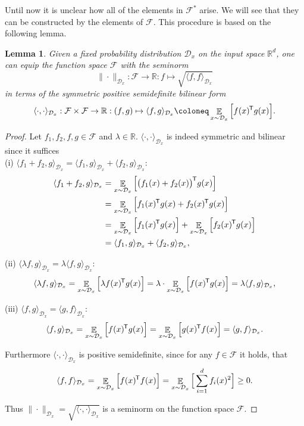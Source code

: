 \documentclass[11pt, a4paper]{article}
\newtheorem{lemma}[theorem]{Lemma}
\newcommand{\R}{\mathbb{R}}
\newcommand{\D}{\mathcal{D}}
\newcommand{\F}{\mathcal{F}}
\newcommand*{\tr}{^{\mkern-1.5mu\mathsf{T}}}
\DeclareMathOperator*{\E}{\mathbb{E}}
\begin{document}
Until now it is unclear how all of the elements in $\F^*$ arise. We will see that they can be constructed by the elements of $\F$. This procedure is based on the following lemma.

\begin{lemma}
Given a fixed probability distribution $\D_x$ on the input space $\R^d$, one can equip the function space $\F$ with the seminorm
\[ \| \cdot \|_{\D_x} : \F \to \R : f \mapsto \sqrt{\langle f , f \rangle_{\D_x}} \] 
in terms of the symmetric positive semidefinite bilinear form
\[ \langle \cdot,\cdot \rangle_{\D_x} : \F \times \F \to \R : (f,g) \mapsto \langle f,g \rangle_{\D_x} \coloneq \E_{x \sim \D_x} \Big [ f(x)\tr g(x) \Big ].\]
\end{lemma}

\begin{proof}
Let $f_1, f_2, f, g \in \F$ and $\lambda \in \R$. $\langle \cdot,\cdot \rangle_{\D_x}$ is indeed symmetric and bilinear since it suffices \\

(i) $\langle f_1 + f_2 , g \rangle_{\D_x} = \langle f_1 , g \rangle_{\D_x} + \langle f_2 , g \rangle_{\D_x}$:
\[ \begin{split}
\langle f_1 + f_2 , g \rangle_{\D_x}
&= \E_{x \sim \D_x} \Big [ \big ( f_1(x) + f_2(x) \big )\tr g(x) \Big ] \\\
&= \E_{x \sim \D_x} \Big [ f_1(x)\tr g(x) + f_2(x)\tr g(x) \Big ] \\\
&= \E_{x \sim \D_x} \Big [ f_1(x)\tr g(x) \Big ] + \E_{x \sim \D_x} \Big [ f_2(x)\tr g(x) \Big ] \\\
&= \langle f_1 , g \rangle_{\D_x} + \langle f_2 , g \rangle_{\D_x},
\end{split} \]

(ii) $\langle \lambda f , g \rangle_{\D_x} = \lambda \langle f, g \rangle_{\D_x}$:
\[ \langle \lambda f , g \rangle_{\D_x} = \E_{x \sim \D_x} \Big [ \lambda f(x)\tr g(x) \Big ] = \lambda \cdot \E_{x \sim \D_x} \Big [ f(x)\tr g(x) \Big ] = \lambda \langle f, g \rangle_{\D_x}, \]

(iii) $\langle f , g \rangle_{\D_x} = \langle g , f \rangle_{\D_x}$:
\[ \langle f , g \rangle_{\D_x} = \E_{x \sim \D_x} \Big [ f(x)\tr g(x) \Big ] = \E_{x \sim \D_x} \Big [ g(x)\tr f(x) \Big ] = \langle g , f \rangle_{\D_x}. \]

Furthermore $\langle \cdot,\cdot \rangle_{\D_x}$ is positive semidefinite, since for any $f \in \F$ it holds, that
\[ \langle f , f \rangle_{\D_x} =  \E_{x \sim \D_x} \Big [ f(x)\tr f(x) \Big ] = \E_{x \sim \D_x} \Big [ \sum_{i=1}^{d} f_i(x)^2 \Big ] \geq 0. \]

Thus $\| \cdot \|_{\D_x} = \sqrt{\langle \cdot , \cdot \rangle_{\D_x}}$ is a seminorm on the function space $\F$.
\end{proof}
\end{document}
